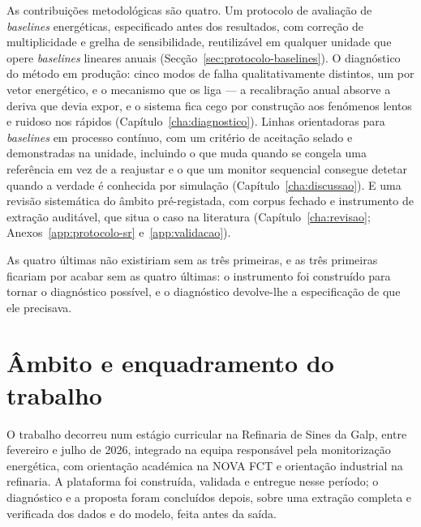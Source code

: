 As contribuições metodológicas são quatro. Um protocolo de avaliação de
\emph{baselines} energéticas, especificado antes dos resultados, com
correção de multiplicidade e grelha de sensibilidade, reutilizável em
qualquer unidade que opere \emph{baselines} lineares anuais
(Secção~\ref{sec:protocolo-baselines}). O diagnóstico do método em
produção: cinco modos de falha qualitativamente distintos, um por vetor
energético, e o mecanismo que os liga --- a recalibração anual absorve a
deriva que devia expor, e o sistema fica cego por construção aos
fenómenos lentos e ruidoso nos rápidos (Capítulo~\ref{cha:diagnostico}).
Linhas orientadoras para \emph{baselines} em processo contínuo, com um
critério de aceitação selado e demonstradas na unidade, incluindo o que
muda quando se congela uma referência em vez de a reajustar e o que um
monitor sequencial consegue detetar quando a verdade é conhecida por
simulação (Capítulo~\ref{cha:discussao}). E uma revisão sistemática do
âmbito pré-registada, com corpus fechado e instrumento de extração
auditável, que situa o caso na literatura (Capítulo~\ref{cha:revisao};
Anexos~\ref{app:protocolo-sr} e~\ref{app:validacao}).

As quatro últimas não existiriam sem as três primeiras, e as três
primeiras ficariam por acabar sem as quatro últimas: o instrumento foi
construído para tornar o diagnóstico possível, e o diagnóstico
devolve-lhe a especificação de que ele precisava.

\section{Âmbito e enquadramento do trabalho}
\label{sec:ambito}

O trabalho decorreu num estágio curricular na Refinaria de Sines da
Galp, entre fevereiro e julho de 2026, integrado na equipa responsável
pela monitorização energética, com orientação académica na NOVA FCT e
orientação industrial na refinaria. A plataforma foi construída,
validada e entregue nesse período; o diagnóstico e a proposta foram
concluídos depois, sobre uma extração completa e verificada dos dados e
do modelo, feita antes da saída.

